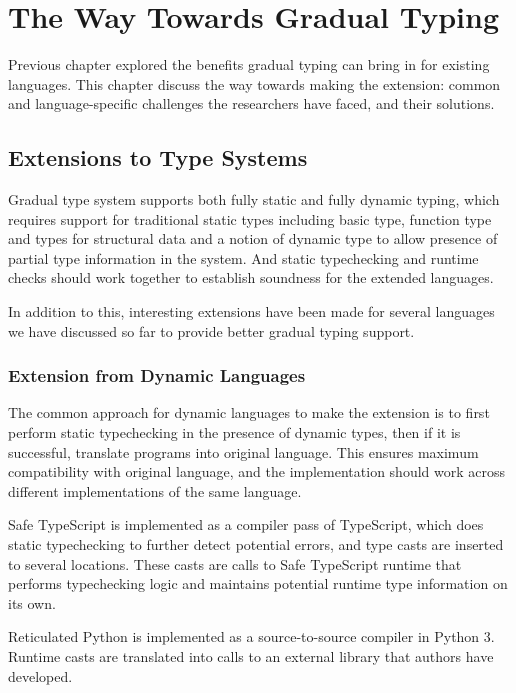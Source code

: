 
\renewcommand{\thechapter}{3}

\chapter{The Way Towards Gradual Typing}

Previous chapter explored the benefits gradual typing
can bring in for existing languages.
This chapter discuss the way towards making the extension:
common and language-specific challenges the researchers have faced,
and their solutions.

\section{Extensions to Type Systems}

Gradual type system supports both fully static and fully dynamic typing,
which requires support for traditional static types including
basic type, function type and types for structural data
and a notion of dynamic type to allow presence of partial type information
in the system. And static typechecking and runtime checks should work together
to establish soundness for the extended languages.

In addition to this, interesting extensions have been made
for several languages we have discussed so far to provide better gradual
typing support.

\subsection{Extension from Dynamic Languages}

The common approach for dynamic languages to make the extension
is to first perform static typechecking in the presence of dynamic types,
then if it is successful, translate programs into original language.
This ensures maximum compatibility with original language, and
the implementation should work across different implementations of the same language.

Safe TypeScript is implemented as a compiler pass of TypeScript,
which does static typechecking to further detect potential errors,
and type casts are inserted to several locations. These casts are calls
to Safe TypeScript runtime that performs typechecking logic and maintains
potential runtime type information on its own.

Reticulated Python is implemented as a source-to-source compiler
in Python 3. Runtime casts are translated into calls to an external library
that authors have developed.

